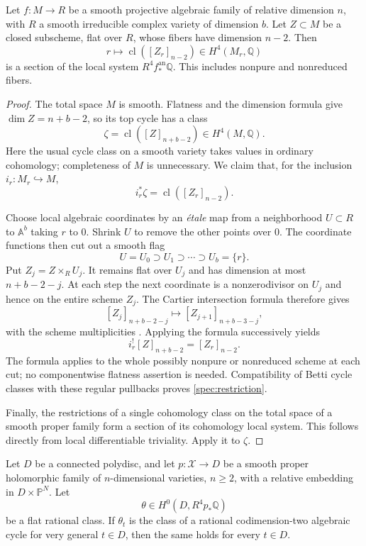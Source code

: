 \begin{lemma}
\label{spec:flat-cycle}
Let $f:M\to R$ be a smooth projective algebraic family of relative
dimension $n$, with $R$ a smooth irreducible complex variety of dimension
$b$.  Let $Z\subset M$ be a closed subscheme, flat over $R$, whose fibers
have dimension $n-2$.  Then
\[
 r\longmapsto
 \operatorname{cl}([Z_r]_{n-2})\in H^4(M_r,\mathbb Q)
\]
is a section of the local system $R^4f^{\mathrm{an}}_*\mathbb Q$.
This includes nonpure and nonreduced fibers.
\end{lemma}

\begin{proof}
The total space $M$ is smooth.  Flatness and the dimension formula give
$\dim Z=n+b-2$, so its top cycle has a class
\[
 \zeta=\operatorname{cl}([Z]_{n+b-2})\in H^4(M,\mathbb Q).
\]
Here the usual cycle class on a smooth variety takes values in ordinary
cohomology; completeness of $M$ is unnecessary.
We claim that, for the inclusion $i_r:M_r\hookrightarrow M$,
\begin{equation}
 \label{spec:restriction}
 i_r^*\zeta=\operatorname{cl}([Z_r]_{n-2}).
\end{equation}

Choose local algebraic coordinates by an \emph{\'etale} map from
a neighborhood $U\subset R$ to $\mathbb A^b$ taking $r$ to $0$.
Shrink $U$ to remove the other points over $0$. The coordinate
functions then cut out a smooth flag
\[
 U=U_0\supset U_1\supset\cdots\supset U_b=\{r\}.
\]
Put $Z_j=Z\times_R U_j$. It remains flat over $U_j$ and has dimension
at most $n+b-2-j$. At each step the next coordinate is a
nonzerodivisor on $U_j$ and hence on the entire scheme $Z_j$.
The Cartier intersection formula therefore gives
\[
 [Z_j]_{n+b-2-j}\longmapsto[Z_{j+1}]_{n+b-3-j},
\]
with the scheme multiplicities
\cite[Lemma~42.29.5, Tag~02TB]{StacksCartier}.
Applying the formula successively yields
\[
 i_r^![Z]_{n+b-2}=[Z_r]_{n-2}.
\]
The formula applies to the whole possibly nonpure or nonreduced
scheme at each cut; no componentwise flatness assertion is needed.
Compatibility of Betti cycle classes with these regular pullbacks proves
\eqref{spec:restriction}.

Finally, the restrictions of a single cohomology class on the total
space of a smooth proper family form a section of its cohomology local
system.  This follows directly from local differentiable triviality.
Apply it to $\zeta$.
\end{proof}

\begin{proposition}
\label{spec:specialization}
Let $D$ be a connected polydisc, and let
$p:\mathcal X\to D$ be a smooth proper holomorphic family of
$n$-dimensional varieties, $n\geq2$, with a relative embedding in
$D\times\mathbb P^N$.  Let
\[
 \theta\in H^0(D,R^4p_*\mathbb Q)
\]
be a flat rational class.  If $\theta_t$ is the class of a rational
codimension-two algebraic cycle for very general $t\in D$, then the same
holds for every $t\in D$.
\end{proposition}

